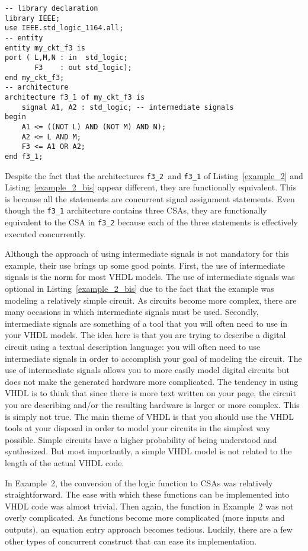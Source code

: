 \begin{lstlisting}[float, label=example_2_bis, caption=Alternative solution of Example~2.]
-- library declaration
library IEEE;
use IEEE.std_logic_1164.all;
-- entity
entity my_ckt_f3 is
port ( L,M,N : in  std_logic;
       F3    : out std_logic);
end my_ckt_f3;
-- architecture
architecture f3_1 of my_ckt_f3 is
	signal A1, A2 : std_logic; -- intermediate signals
begin
	A1 <= ((NOT L) AND (NOT M) AND N);
	A2 <= L AND M;
	F3 <= A1 OR A2;
end f3_1;
\end{lstlisting}

Despite the fact that the architectures \texttt{f3\_2 }and \texttt{f3\_1} of Listing~\ref{example_2} and Listing~\ref{example_2_bis} appear different, they are functionally equivalent. This is because all the statements are concurrent signal assignment statements. Even though the \texttt{f3\_1} architecture contains three CSAs, they are functionally equivalent to the CSA in \texttt{f3\_2} because each of the three statements is effectively executed concurrently.

Although the approach of using intermediate signals is not mandatory for this example, their use brings up some good points. First, the use of intermediate signals is the norm for most VHDL models. The use of intermediate signals was optional in Listing~\ref{example_2_bis} due to the fact that the example was modeling a relatively simple circuit. As circuits become more complex, there are many occasions in which intermediate signals must be used. Secondly, intermediate signals are something of a tool that you will often need to use in your VHDL models. The idea here is that you are trying to describe a digital circuit using a textual description language: you will often need to use intermediate signals in order to accomplish your goal of modeling the circuit. The use of intermediate signals allows you to more easily model digital circuits but does not make the generated hardware more complicated. The tendency in using VHDL is to think that since there is more text written on your page, the circuit you are describing and/or the resulting hardware is larger or more complex. This is simply not true. The main theme of VHDL is that you should use the VHDL tools at your disposal in order to model your circuits in the simplest way possible. Simple circuits have a higher probability of being understood and synthesized. But most importantly, a simple VHDL model is not related to the length of the actual VHDL code.

In Example~2, the conversion of the logic function to CSAs was relatively straightforward. The ease with which these functions can be implemented into VHDL code was almost trivial. Then again, the function in Example~2 was not overly complicated. As functions become more complicated (more inputs and outputs), an equation entry approach becomes tedious. Luckily, there are a few other types of concurrent construct that can ease its implementation.

